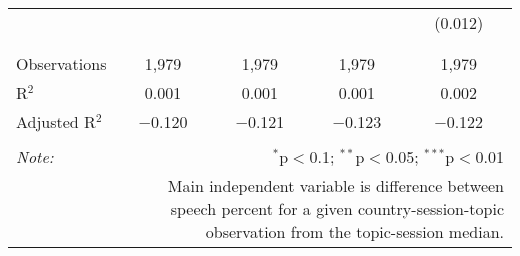 \begin{table}[!htbp]
\begin{tabular}{@{\extracolsep{5pt}}lcccc}
  &  &  &  & (0.012) \\ 
  & & & & \\ 
\hline \\[-1.8ex] 
Observations & 1,979 & 1,979 & 1,979 & 1,979 \\ 
R$^{2}$ & 0.001 & 0.001 & 0.001 & 0.002 \\ 
Adjusted R$^{2}$ & $-$0.120 & $-$0.121 & $-$0.123 & $-$0.122 \\ 
\hline 
\hline \\[-1.8ex] 
\textit{Note:}  & \multicolumn{4}{r}{$^{*}$p$<$0.1; $^{**}$p$<$0.05; $^{***}$p$<$0.01} \\ 
 & \multicolumn{4}{r}{Main independent variable is difference between speech percent for a given country-session-topic observation from the topic-session median.} \\ 
\end{tabular} 
\end{table} 
